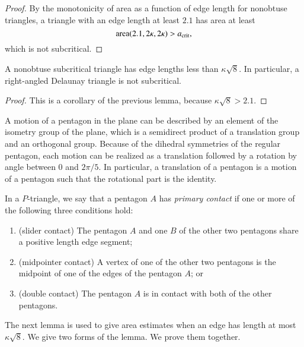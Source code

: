 \begin{proof} By the monotonicity of area as a function of edge length
  for nonobtuse triangles, a triangle with an edge length at least
  $2.1$ has area at least
\[
{\operatorname{area}}(2.1,2\kappa,2\kappa) > a_\text{crit},
\] %
which is not subcritical.
\end{proof}

\begin{lemma} 
  A nonobtuse subcritical triangle has edge lengths less than
  $\kappa\sqrt8$.  In particular, a right-angled Delaunay triangle is
  not subcritical.
\end{lemma}

\begin{proof}  
This is a corollary of the previous lemma, because $\kappa\sqrt8 >
2.1$.
\end{proof}

\begin{remark}
  A motion of a pentagon in the plane can be described by an element
  of the isometry group of the plane, which is a semidirect product of
  a translation group and an orthogonal group.  Because of the
  dihedral symmetries of the regular pentagon, each motion can be
  realized as a translation followed by a rotation by angle between
  $0$ and $2\pi/5$.  In particular, a translation of a pentagon is a
  motion of a pentagon such that the rotational part is the identity.
\end{remark}


\begin{definition}
In a $P$-triangle, we say that a pentagon $A$ has {\it primary
  contact} if one or more of the following three conditions hold:
\begin{enumerate}
\item (slider contact) The pentagon $A$ and one $B$ of the other two
  pentagons share a positive length edge segment;
\item (midpointer contact) A vertex of one of the other two pentagons
  is the midpoint of one of the edges of the pentagon $A$; or
\item (double contact) The pentagon $A$ is in contact with both of the
  other pentagons.
\end{enumerate}
\end{definition}

The next lemma is used to give area estimates when an edge has length
at most $\kappa\sqrt{8}$.  We give two forms of the lemma.  We prove
them together.

